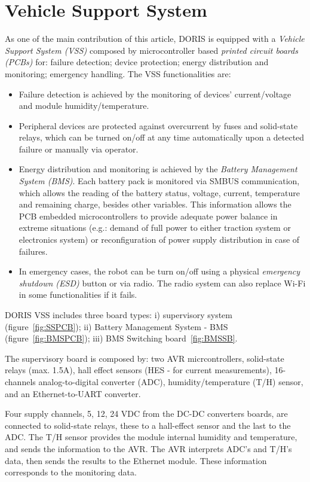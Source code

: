 \documentclass{ifacconf}
\begin{document}
\section{Vehicle Support System}\label{sec:VSS}

As one of the main contribution of this article, DORIS is equipped with a
\emph{Vehicle Support System (VSS)} composed by microcontroller based
\emph{printed circuit boards (PCBs)} for: failure detection; device protection;
energy distribution and monitoring; emergency handling. The VSS functionalities
are:
  
\begin{itemize}
    \item Failure detection is achieved by the monitoring of devices'
    current/voltage and module humidity/temperature.
    \item Peripheral devices are protected against overcurrent by fuses and
    solid-state relays, which can be turned on/off at any time automatically
    upon a detected failure or manually via operator.
    \item Energy distribution and monitoring is achieved by the \emph{Battery
    Management System (BMS)}. Each battery pack is monitored via SMBUS
    communication, which allows the reading of the battery status, voltage,
    current, temperature and remaining charge, besides other variables. This
    information allows the PCB embedded microcontrollers to provide adequate
    power balance in extreme situations (e.g.: demand of full power to either
    traction system or electronics system) or reconfiguration of power supply
    distribution in case of failures. 
    \item In emergency cases, the robot can be turn on/off using a physical
    \emph{emergency shutdown (ESD)} button or via radio. The radio system can
    also replace Wi-Fi in some functionalities if it fails.
  \end{itemize}
  
DORIS VSS includes three board types: i) supervisory system
(figure~\ref{fig:SSPCB}); ii) Battery Management System - BMS
(figure~\ref{fig:BMSPCB}); iii) BMS Switching board~\ref{fig:BMSSB}.

The supervisory board is composed by: two AVR micrcontrollers, solid-state
relays (max. 1.5A), hall effect sensors (HES - for current measurements),
16-channels analog-to-digital converter (ADC), humidity/temperature (T/H)
sensor, and an Ethernet-to-UART converter. 

Four supply channels, 5, 12, 24 VDC from the DC-DC converters boards, are
connected to solid-state relays, these to a hall-effect sensor and the last to
the ADC. The T/H sensor provides the module internal humidity and temperature,
and sends the information to the AVR. The AVR interprets ADC's and T/H's data,
then sends the results to the Ethernet module. These information corresponds to
the monitoring data. 
\end{document}
